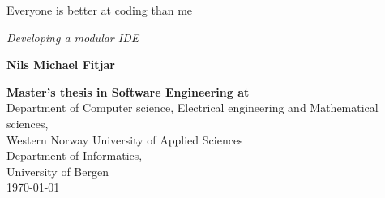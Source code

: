 
\begin{titlepage} %
  \selectfont
  \centering %


  \vspace{200pt}
  {\Huge Everyone is better at coding than me} \\ %
  \vspace{5pt}

  {\Large \textsl{Developing a modular IDE}} %
  \vspace{50pt}


  \LARGE{\textbf{Nils Michael Fitjar}}\\ %

  \vfill %



  {\Large \textbf{Master's thesis in Software Engineering at} \\
  \vspace{10pt}
  Department of Computer science, Electrical engineering and Mathematical sciences, \\
  Western Norway University of Applied Sciences \\
  \vspace{10pt}
  Department of  Informatics, \\
  University of Bergen \\}
  \vspace{10pt}
  {\large \monthyeardate\today} %


\end{titlepage}
